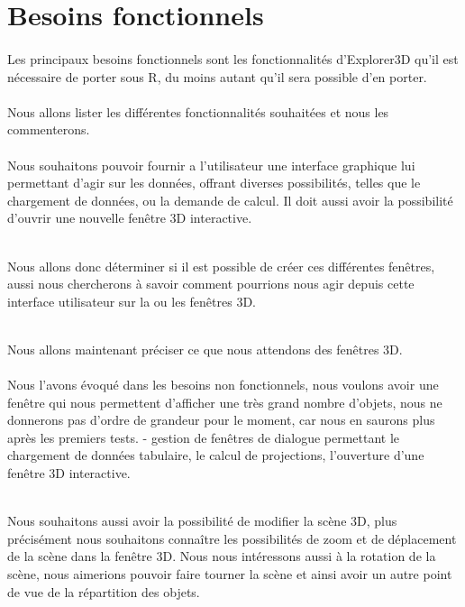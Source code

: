 \section{Besoins fonctionnels}
\paragraph{} Les principaux besoins fonctionnels sont les fonctionnalités d'Explorer3D qu'il est nécessaire de porter sous R, du moins autant qu'il sera possible d'en porter.\\\\
\indent Nous allons lister les différentes fonctionnalités souhaitées et nous les commenterons.

\paragraph{} Nous souhaitons pouvoir fournir a l'utilisateur une interface graphique lui permettant d'agir sur les données, offrant diverses possibilités, telles que le chargement de données, ou la demande de calcul. Il doit aussi avoir la possibilité d'ouvrir une nouvelle fenêtre 3D interactive.\\\\\indent

 Nous allons donc déterminer si il est possible de créer ces différentes fenêtres, aussi nous chercherons à savoir comment pourrions nous agir depuis cette interface utilisateur sur la ou les fenêtres 3D.\\\\\indent 
 
 Nous allons maintenant préciser ce que nous attendons des fenêtres 3D.\\\\\indent Nous l'avons évoqué dans les besoins non fonctionnels, nous voulons avoir une fenêtre qui nous permettent d'afficher une très grand nombre d'objets, nous ne donnerons pas d'ordre de grandeur pour le moment, car nous en saurons plus après les premiers tests.
- gestion de fenêtres de dialogue permettant le chargement de données tabulaire, le calcul de projections, l'ouverture d'une fenêtre 3D interactive.\\\\\indent

Nous souhaitons aussi avoir la possibilité de modifier la scène 3D, plus précisément nous souhaitons connaître les possibilités de zoom et de déplacement de la scène dans la fenêtre 3D. Nous nous intéressons aussi à la rotation de la scène, nous aimerions pouvoir faire tourner la scène et ainsi avoir un autre point de vue de la répartition des objets.\\\\\indent

